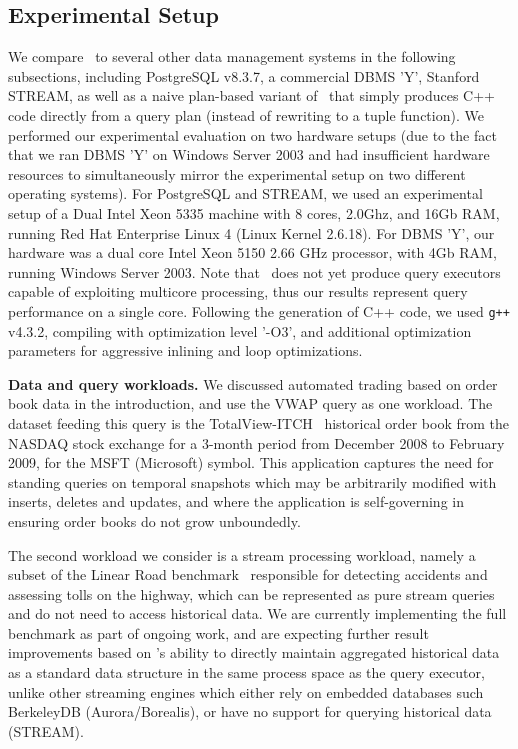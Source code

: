\subsection{Experimental Setup}
We compare \compiler\ to several other data management systems in the following
subsections, including PostgreSQL v8.3.7, a commercial DBMS 'Y', Stanford STREAM,
as well as a naive plan-based variant of \compiler\ that simply produces C++ code
directly from a query plan (instead of rewriting to a tuple function). We
performed our experimental evaluation on two hardware setups (due to the fact
that we ran DBMS 'Y' on Windows Server 2003 and had insufficient hardware
resources to simultaneously mirror the experimental setup on two different
operating systems). For PostgreSQL and STREAM, we used an experimental setup of a
Dual Intel Xeon 5335 machine with 8 cores, 2.0Ghz, and 16Gb RAM, running Red Hat
Enterprise Linux 4 (Linux Kernel 2.6.18). For DBMS 'Y', our hardware was a dual
core Intel Xeon 5150 2.66 GHz processor, with 4Gb RAM, running Windows Server
2003. Note that \compiler\ does not yet produce query executors capable of
exploiting multicore processing, thus our results represent query performance on
a single core. Following the generation of C++ code, we used \texttt{g++} v4.3.2,
compiling with optimization level '-O3', and additional optimization parameters
for aggressive inlining and loop optimizations.

\textbf{Data and query workloads.}
We discussed automated trading based on order book data in the introduction, and
use the VWAP query as one workload. The dataset feeding this query is the
TotalView-ITCH~\cite{totalview-url} historical order book from the NASDAQ stock
exchange for a 3-month period from December 2008 to February 2009, for the MSFT
(Microsoft) symbol. This application captures the need for standing queries on
temporal snapshots which may be arbitrarily modified with inserts, deletes and
updates, and where the application is self-governing in ensuring order books do
not grow unboundedly.

The second workload we consider is a stream processing workload, namely a subset
of the Linear Road benchmark~\cite{arasu-vldb:04} responsible for detecting
accidents and assessing tolls on the highway, which can be represented as pure
stream queries and do not need to access historical data. We are currently
implementing the full benchmark as part of ongoing work, and are expecting
further result improvements based on \compiler's ability to directly maintain
aggregated historical data as a standard data structure in the same process space
as the query executor, unlike other streaming engines which either rely on
embedded databases such BerkeleyDB (Aurora/Borealis), or have no support for
querying historical data (STREAM).

